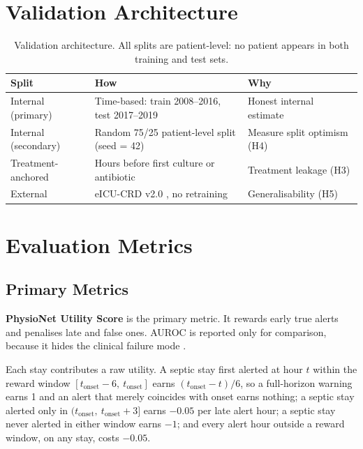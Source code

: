 \section{Validation Architecture}
\label{sec:validation}

\begin{table}[H]
    \centering\small
    \begin{tabular}{p{2.8cm}p{6.5cm}p{3.5cm}}
        \toprule
        \textbf{Split} & \textbf{How} & \textbf{Why} \\
        \midrule
        Internal (primary) & Time-based: train 2008--2016, test 2017--2019
        \cite{guo2022temporal} & Honest internal estimate \\
        Internal (secondary) & Random 75/25 patient-level split (seed = 42)
        & Measure split optimism (H4) \\
        Treatment-anchored & Hours before first culture or antibiotic
        \cite{kamran2024evaluation} & Treatment leakage (H3) \\
        External & eICU-CRD v2.0 \cite{pollard2018eicu}, no retraining
        & Generalisability (H5) \\
        \bottomrule
    \end{tabular}
    \caption{Validation architecture. All splits are patient-level: no patient
    appears in both training and test sets.}
    \label{tab:validation}
\end{table}


\section{Evaluation Metrics}
\label{sec:metrics}

\subsection{Primary Metrics}

\textbf{PhysioNet Utility Score} \cite{reyna2020utility} is the primary
metric. It rewards early true alerts and penalises late and false ones. AUROC
is reported only for comparison, because it hides the clinical failure mode
\cite{wang2025srpm}.

Each stay contributes a raw utility. A septic stay first alerted at hour $t$
within the reward window $[t_{\mathrm{onset}} - 6,\ t_{\mathrm{onset}}]$ earns
$(t_{\mathrm{onset}} - t)/6$, so a full-horizon warning earns 1 and an alert
that merely coincides with onset earns nothing; a septic stay alerted only in
$(t_{\mathrm{onset}},\ t_{\mathrm{onset}} + 3]$ earns $-0.05$ per late alert
hour; a septic stay never alerted in either window earns $-1$; and every alert
hour outside a reward window, on any stay, costs $-0.05$.

